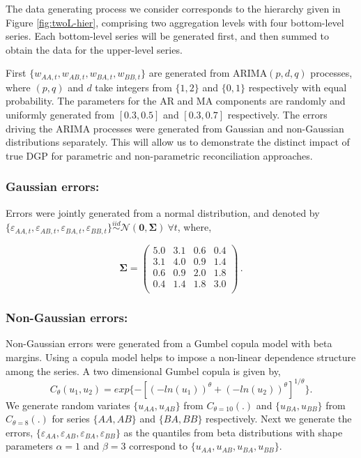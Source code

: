 \documentclass[12pt]{article}
\theoremstyle{definition}
\begin{document}
The data generating process we consider corresponds to the hierarchy given in Figure \ref{fig:twoL-hier}, comprising two aggregation levels with four bottom-level series. Each bottom-level series will be generated first, and then summed to obtain the data for the upper-level series.

First $\{w_{AA,t},w_{AB,t},w_{BA,t},w_{BB,t}\}$ are generated from ARIMA$(p,d,q)$ processes, where $(p,q)$ and $d$ take integers from $\{1,2\}$ and $\{0,1\}$ respectively with equal probability. The parameters for the AR and MA components are randomly and uniformly generated from $[0.3,0.5]$ and $[0.3,0.7]$ respectively.
The errors driving the ARIMA processes were generated from Gaussian and non-Gaussian distributions separately. This will allow us to demonstrate the distinct impact of true DGP for parametric and non-parametric reconciliation approaches. 


\subsubsection*{Gaussian errors:}

Errors were jointly generated from a normal distribution, and denoted by $\{\varepsilon_{AA,t},\varepsilon_{AB,t},\varepsilon_{BA,t},\varepsilon_{BB,t}\} \overset{iid}{\sim} \mathcal{N}(\bm{0}, \bm{\Sigma})~\forall t$, where,


\begin{equation}\label{eq:SigmaGaussian}
\bm{\Sigma} =
\begin{pmatrix}
5.0 & 3.1 & 0.6 & 0.4 \\
3.1 & 4.0 & 0.9 & 1.4 \\
0.6 & 0.9 & 2.0 & 1.8 \\
0.4 & 1.4 & 1.8 & 3.0 \\
\end{pmatrix}\,.
\end{equation}


\subsubsection*{Non-Gaussian errors:}

Non-Gaussian errors were generated from a Gumbel copula model with beta margins. Using a copula model helps to impose a non-linear dependence structure among the series. A two dimensional Gumbel copula is given by,
\begin{equation*}
C_\theta(u_1, u_2) = exp\{-[(-ln(u_1))^\theta + (-ln(u_2))^\theta]^{1/\theta}\}.
\end{equation*}
We generate random variates $\{u_{AA}, u_{AB}\}$ from $C_{\theta=10}(.)$ and $\{u_{BA}, u_{BB}\}$ from $C_{\theta=8}(.)$ for series $\{AA, AB\}$ and $\{BA, BB\}$ respectively. Next we generate the errors, $\{\varepsilon_{AA}, \varepsilon_{AB}, \varepsilon_{BA}, \varepsilon_{BB}\}$ as the quantiles from beta distributions with shape parameters $\alpha = 1$ and $\beta = 3$ correspond to $\{u_{AA}, u_{AB}, u_{BA}, u_{BB}\}$.
\end{document}
